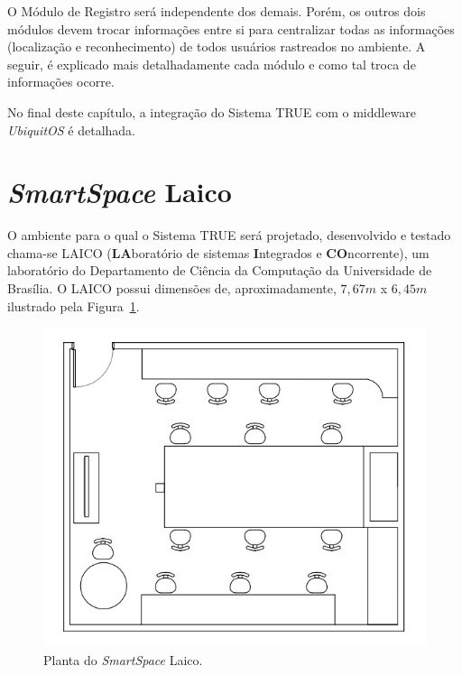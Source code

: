 	O Módulo de Registro será independente dos demais. Porém, os outros dois
	módulos devem trocar informações entre si para centralizar todas as informações
	(localização e reconhecimento) de todos usuários rastreados no ambiente. A
	seguir, é explicado mais detalhadamente cada módulo e como tal troca de
	informações ocorre.

	No final deste capítulo, a integração do Sistema TRUE com o middleware
	\textit{UbiquitOS} é detalhada.



	
	
	
	



	\section{\textit{SmartSpace} Laico}

		O ambiente para o qual o Sistema TRUE será projetado, desenvolvido e testado
		chama-se LAICO (\textbf{LA}boratório de sistemas \textbf{I}ntegrados e
		\textbf{CO}ncorrente), um laboratório do Departamento de Ciência da Computação
		da Universidade de Brasília. O LAICO possui dimensões de, aproximadamente, 
		$\displaystyle 7,67m$ x $\displaystyle 6,45m$ ilustrado pela
		Figura~\ref{fig:laico}.
	
		\begin{figure}[hbt]
			\begin{center}
				\includegraphics[scale=0.6]{figuras/4.ProblemaEProposta/laico.png}
			\end{center}
			\caption{Planta do \textit{SmartSpace} Laico.}
			\label{fig:laico}
		\end{figure}	














